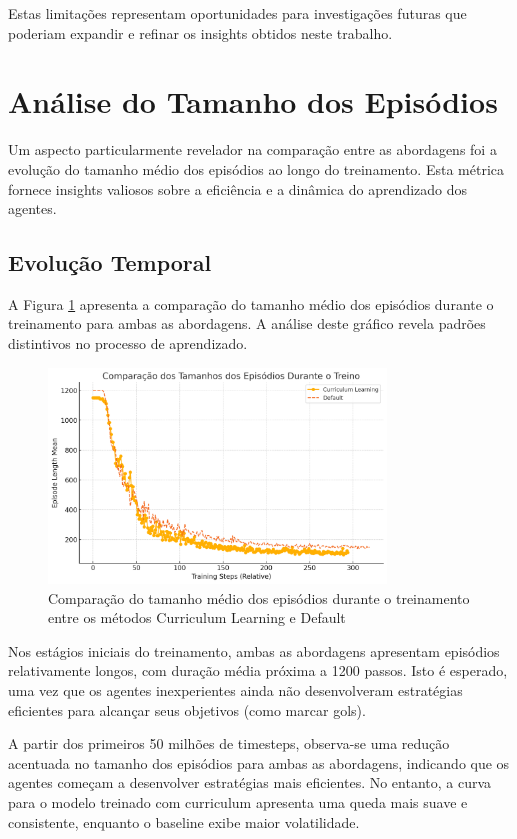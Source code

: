 Estas limitações representam oportunidades para investigações futuras que poderiam expandir e refinar os insights obtidos neste trabalho.

\section{Análise do Tamanho dos Episódios}
\label{sec:analise_tamanho}

Um aspecto particularmente revelador na comparação entre as abordagens foi a evolução do tamanho médio dos episódios ao longo do treinamento. Esta métrica fornece insights valiosos sobre a eficiência e a dinâmica do aprendizado dos agentes.

\subsection{Evolução Temporal}

A Figura \ref{fig:tamanho_eps} apresenta a comparação do tamanho médio dos episódios durante o treinamento para ambas as abordagens. A análise deste gráfico revela padrões distintivos no processo de aprendizado.

\begin{figure}[H]
    \centering
    \includegraphics[width=0.8\textwidth]{fig/tamanho_eps.png}
    \caption{Comparação do tamanho médio dos episódios durante o treinamento entre os métodos Curriculum Learning e Default}
    \label{fig:tamanho_eps}
\end{figure}

Nos estágios iniciais do treinamento, ambas as abordagens apresentam episódios relativamente longos, com duração média próxima a 1200 passos. Isto é esperado, uma vez que os agentes inexperientes ainda não desenvolveram estratégias eficientes para alcançar seus objetivos (como marcar gols).

A partir dos primeiros 50 milhões de timesteps, observa-se uma redução acentuada no tamanho dos episódios para ambas as abordagens, indicando que os agentes começam a desenvolver estratégias mais eficientes. No entanto, a curva para o modelo treinado com curriculum apresenta uma queda mais suave e consistente, enquanto o baseline exibe maior volatilidade.

